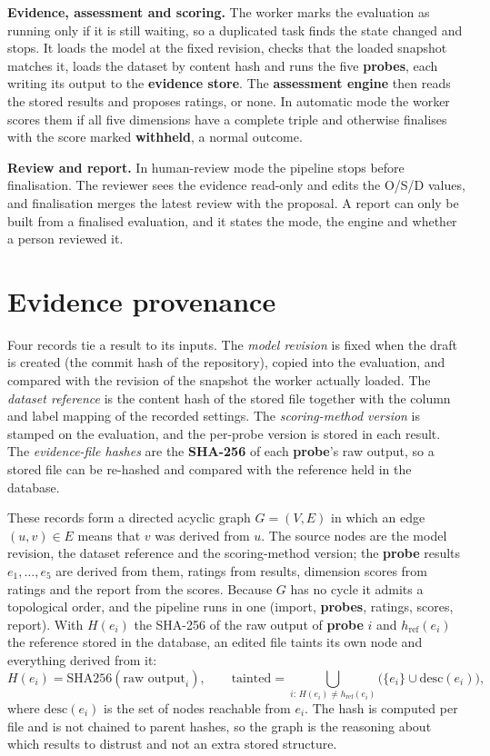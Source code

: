 \textbf{Evidence, assessment and scoring.} The worker marks the evaluation as running only if it is still waiting, so a duplicated task finds the state changed and stops. It loads the model at the fixed revision, checks that the loaded snapshot matches it, loads the dataset by content hash and runs the five \textbf{probes}, each writing its output to the \textbf{evidence store}. The \textbf{assessment engine} then reads the stored results and proposes ratings, or none. In automatic mode the worker scores them if all five dimensions have a complete triple and otherwise finalises with the score marked \textbf{withheld}, a normal outcome.

\textbf{Review and report.} In human-review mode the pipeline stops before finalisation. The reviewer sees the evidence read-only and edits the O/S/D values, and finalisation merges the latest review with the proposal. A report can only be built from a finalised evaluation, and it states the mode, the engine and whether a person reviewed it.

\section{Evidence provenance}\label{sec:provenance}
Four records tie a result to its inputs. The \emph{model revision} is fixed when the draft is created (the commit hash of the repository), copied into the evaluation, and compared with the revision of the snapshot the worker actually loaded. The \emph{dataset reference} is the content hash of the stored file together with the column and label mapping of the recorded settings. The \emph{scoring-method version} is stamped on the evaluation, and the per-probe version is stored in each result. The \emph{evidence-file hashes} are the \textbf{SHA-256} of each \textbf{probe}'s raw output, so a stored file can be re-hashed and compared with the reference held in the database.

These records form a directed acyclic graph $G=(V,E)$ in which an edge $(u,v)\in E$ means that $v$ was derived from $u$. The source nodes are the model revision, the dataset reference and the scoring-method version; the \textbf{probe} results $e_1,\dots,e_5$ are derived from them, ratings from results, dimension scores from ratings and the report from the scores. Because $G$ has no cycle it admits a topological order, and the pipeline runs in one (import, \textbf{probes}, ratings, scores, report). With $H(e_i)$ the SHA-256 of the raw output of \textbf{probe} $i$ and $h_{\mathrm{ref}}(e_i)$ the reference stored in the database, an edited file taints its own node and everything derived from it:
\begin{equation}
H(e_i)=\mathrm{SHA256}(\text{raw output}_i),\qquad
\mathrm{tainted}=\bigcup_{i:\,H(e_i)\neq h_{\mathrm{ref}}(e_i)}\bigl(\{e_i\}\cup\mathrm{desc}(e_i)\bigr),\label{eq:taint}
\end{equation}
where $\mathrm{desc}(e_i)$ is the set of nodes reachable from $e_i$. The hash is computed per file and is not chained to parent hashes, so the graph is the reasoning about which results to distrust and not an extra stored structure.

